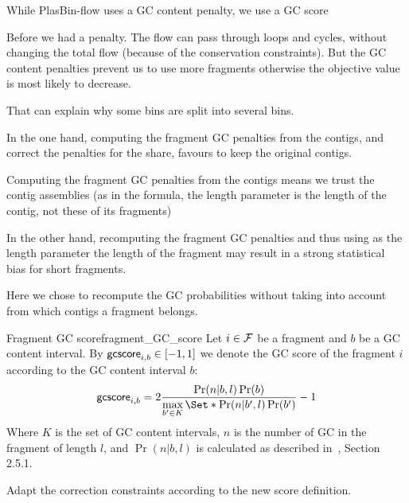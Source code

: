 \begin{newfeatbox}
  While PlasBin-flow uses a GC content penalty, we use a GC score

  \begin{questionbox}
    Before we had a penalty.
    The flow can pass through loops and cycles, without changing the total flow (because of the conservation constraints). But the GC content penalties prevent us to use more fragments otherwise the objective value is most likely to decrease.

    That can explain why some bins are split into several bins.
  \end{questionbox}

  \begin{questionbox}
    In the one hand, computing the fragment GC penalties from the contigs, and correct the penalties for the share, favours to keep the original contigs.

    Computing the fragment GC penalties from the contigs means we trust the contig assemblies (as in the formula, the length parameter is the length of the contig, not these of its fragments)

    In the other hand, recomputing the fragment GC penalties and thus using as the length parameter the length of the fragment may result in a strong statistical bias for short fragments.

    \begin{notebox}
      Here we chose to recompute the GC probabilities without taking into account from which contigs a fragment belongs.
    \end{notebox}
  \end{questionbox}
\end{newfeatbox}

\begin{definition}{Fragment GC score}{fragment_GC_score}
  Let \(i \in \mathcal{F}{}\) be a fragment and \(b\) be a GC content interval.
  By \(\mathsf{gcscore}_{i, b} \in [-1, 1]\) we denote the GC score of the fragment \(i\) according to the GC content interval \(b\):
  \[
    \gcscore{i}{b} = 2 \frac{\Pr(n|b,l)\Pr(b)}{\max\limits_{b' \in K}\Set*{\Pr(n|b',l)\Pr(b')}} - 1
  \]
  Where \(K\) is the set of GC content intervals, \(n\) is the number of GC in the fragment of length \(l\), and \(\Pr(n|b,l)\) is calculated as described in~\cite{manePlasBinflowFlowbasedMILP2023}, Section 2.5.1.

  \begin{fixmebox}
    Adapt the correction constraints according to the new score definition.
  \end{fixmebox}
\end{definition}

